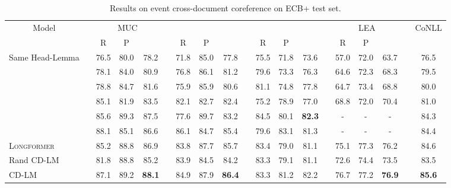 \documentclass[11pt,a4paper]{article}
\begin{document}
\begin{table*}[!ht]
    \centering
    \small
    \begin{tabular}{@{}lcccccccccccccccclc@{}}
    \toprule
    \multicolumn{1}{c}{Model}&\phantom{abc}& \multicolumn{3}{c}{MUC} && \multicolumn{3}{c}{} & & \multicolumn{3}{c}{} && \multicolumn{3}{c}{LEA} && CoNLL\\
    \cmidrule{3-5} \cmidrule{7-9} \cmidrule{11-13} \cmidrule{15-17} \cmidrule{19-19}
    && R & P &  && R & P &  && R &P &  && R &P &  &&   \\ 
   \midrule
        Same Head-Lemma &&  76.5 & 80.0 & 78.2 && 71.8 & 85.0 & 77.8 && 75.5 & 71.8 & 73.6 && 57.0 & 72.0 & 63.7 && 76.5\\
        \citet{barhom-etal-2019-revisiting} && 78.1 & 84.0 & 80.9 && 76.8 & 86.1 & 81.2 && 79.6 & 73.3 & 76.3 && 64.6 & 72.3 & 68.3 && 79.5\\
        \citet{meged-etal-2020-paraphrasing} && 78.8 & 84.7 & 81.6 && 75.9 & 85.9 & 80.6 && 81.1 & 74.8 & 77.8 && 64.7 & 73.4 & 68.8 && 80.0\\
        \citet{Cattan2020StreamliningCC} &&  85.1 & 81.9 & 83.5 && 82.1 & 82.7 & 82.4 && 75.2 & 78.9 & 77.0 && 68.8 & 72.0 & 70.4 && 81.0 \\
        \citet{zeng-etal-2020-event} &&  85.6 & 89.3 & 87.5 && 77.6 & 89.7 & 83.2 && 84.5 & 80.1 & \textbf{82.3}  && - & - & - &&  84.3   \\
        \citet{yu2020paired} &&  88.1 & 85.1 & 86.6 && 86.1 & 84.7 & 85.4 && 79.6 & 83.1 & 81.3 && - & - & - &&  84.4   \\
        \midrule
        \textsc{Longformer} && 85.2  & 88.8 & 86.9 && 83.8 & 87.7 & 85.7 && 83.4 & 79.0 & 81.1 && 75.1 & 77.3 & 76.2 && 84.6 \\
        Rand CD-LM && 81.8  & 88.8 & 85.2 && 83.9 & 84.5 & 84.2 && 83.3 & 79.1 & 81.1 && 72.6 & 74.4 & 73.5 && 83.5\\
        CD-LM && 87.1  & 89.2 & \textbf{88.1} && 84.9 & 87.9 & \textbf{86.4} && 83.3 & 81.2 & 82.2 && 76.7 & 77.2 & \textbf{76.9} && \textbf{85.6} \\

    \bottomrule
    \end{tabular}
    \caption{Results on event cross-document coreference on ECB+ test set.}
    \label{tab:subtopic_results_event}
        \vspace{-3mm}

\end{table*}
\end{document}
